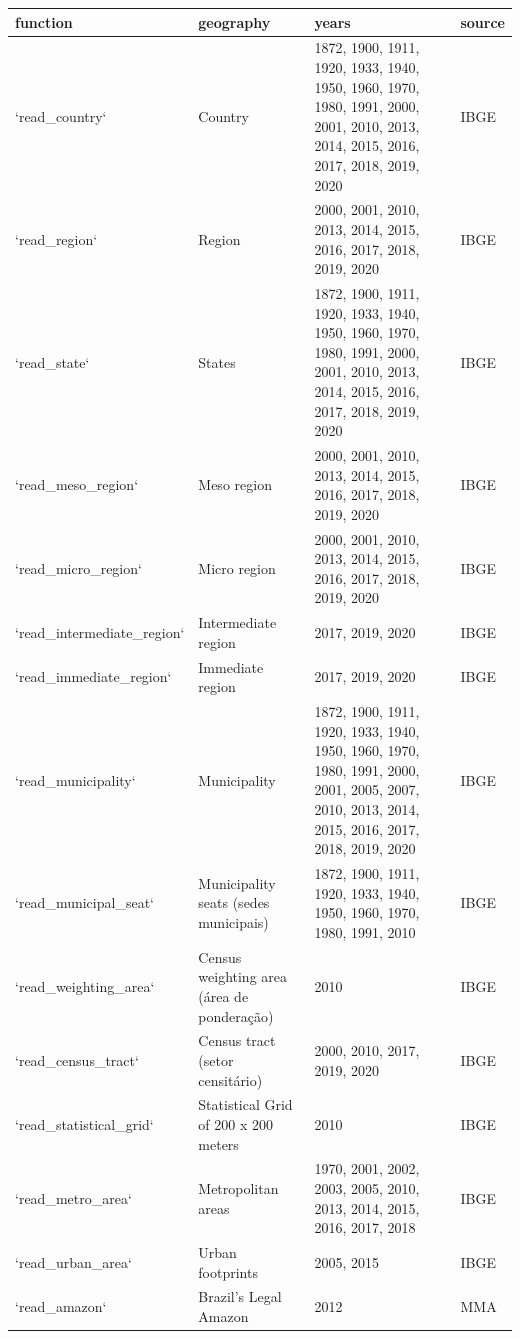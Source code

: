 \documentclass[
  brazilian,
]{book}
\begin{document}
\begin{table}
\centering\begingroup\fontsize{16}{18}\selectfont

\begin{tabular}[t]{l|l|l|l}
\hline
function & geography & years & source\\
\hline
`read\_country` & Country & 1872, 1900, 1911, 1920, 1933, 1940, 1950, 1960, 1970, 1980, 1991, 2000, 2001, 2010, 2013, 2014, 2015, 2016, 2017, 2018, 2019, 2020 & IBGE\\
\hline
`read\_region` & Region & 2000, 2001, 2010, 2013, 2014, 2015, 2016, 2017, 2018, 2019, 2020 & IBGE\\
\hline
`read\_state` & States & 1872, 1900, 1911, 1920, 1933, 1940, 1950, 1960, 1970, 1980, 1991, 2000, 2001, 2010, 2013, 2014, 2015, 2016, 2017, 2018, 2019, 2020 & IBGE\\
\hline
`read\_meso\_region` & Meso region & 2000, 2001, 2010, 2013, 2014, 2015, 2016, 2017, 2018, 2019, 2020 & IBGE\\
\hline
`read\_micro\_region` & Micro region & 2000, 2001, 2010, 2013, 2014, 2015, 2016, 2017, 2018, 2019, 2020 & IBGE\\
\hline
`read\_intermediate\_region` & Intermediate region & 2017, 2019, 2020 & IBGE\\
\hline
`read\_immediate\_region` & Immediate region & 2017, 2019, 2020 & IBGE\\
\hline
`read\_municipality` & Municipality & 1872, 1900, 1911, 1920, 1933, 1940, 1950, 1960, 1970, 1980, 1991, 2000, 2001, 2005, 2007, 2010, 2013, 2014, 2015, 2016, 2017, 2018, 2019, 2020 & IBGE\\
\hline
`read\_municipal\_seat` & Municipality seats (sedes municipais) & 1872, 1900, 1911, 1920, 1933, 1940, 1950, 1960, 1970, 1980, 1991, 2010 & IBGE\\
\hline
`read\_weighting\_area` & Census weighting area (área de ponderação) & 2010 & IBGE\\
\hline
`read\_census\_tract` & Census tract (setor censitário) & 2000, 2010, 2017, 2019, 2020 & IBGE\\
\hline
`read\_statistical\_grid` & Statistical Grid of 200 x 200 meters & 2010 & IBGE\\
\hline
`read\_metro\_area` & Metropolitan areas & 1970, 2001, 2002, 2003, 2005, 2010, 2013, 2014, 2015, 2016, 2017, 2018 & IBGE\\
\hline
`read\_urban\_area` & Urban footprints & 2005, 2015 & IBGE\\
\hline
`read\_amazon` & Brazil's Legal Amazon & 2012 & MMA\\

\end{tabular}
\end{table}
\end{document}
